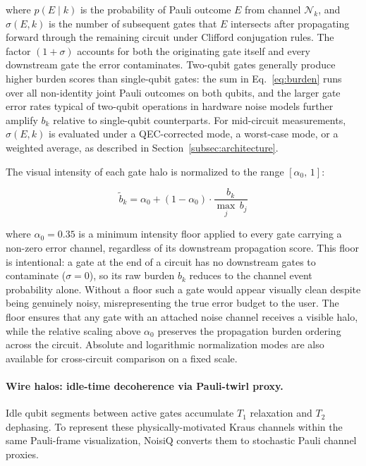 \documentclass[10pt,twocolumn]{article}
\begin{document}
\noindent
where $p(E \mid k)$ is the probability of Pauli outcome $E$ from
channel $\mathcal{N}_k$, and $\sigma(E, k)$ is the number of
subsequent gates that $E$ intersects after propagating forward
through the remaining circuit under Clifford conjugation rules.
The factor $(1 + \sigma)$ accounts for both the originating gate
itself and every downstream gate the error contaminates.
Two-qubit gates generally produce higher burden scores than
single-qubit gates: the sum in Eq.~\ref{eq:burden} runs over all
non-identity joint Pauli outcomes on both qubits, and the larger
gate error rates typical of two-qubit operations in hardware
noise models further amplify $b_k$ relative to single-qubit
counterparts.
For mid-circuit measurements, $\sigma(E, k)$ is evaluated under
a QEC-corrected mode, a worst-case mode, or a weighted average,
as described in Section~\ref{subsec:architecture}.

The visual intensity of each gate halo is normalized to the range
$[\alpha_0,\, 1]$:

\begin{equation}
    \tilde{b}_k
    = \alpha_0
    + (1 - \alpha_0)
    \cdot \frac{b_k}{\displaystyle\max_j\, b_j}
    \label{eq:halo_norm}
\end{equation}

\noindent
where $\alpha_0 = 0.35$ is a minimum intensity floor applied to
every gate carrying a non-zero error channel, regardless of its
downstream propagation score.
This floor is intentional: a gate at the end of a circuit has no
downstream gates to contaminate ($\sigma = 0$), so its raw burden
$b_k$ reduces to the channel event probability alone.
Without a floor such a gate would appear visually clean despite
being genuinely noisy, misrepresenting the true error budget to
the user.
The floor ensures that any gate with an attached noise channel
receives a visible halo, while the relative scaling above $\alpha_0$
preserves the propagation burden ordering across the circuit.
Absolute and logarithmic normalization modes are also available
for cross-circuit comparison on a fixed scale.

\paragraph{Wire halos: idle-time decoherence via Pauli-twirl proxy.}
Idle qubit segments between active gates accumulate $T_1$ relaxation
and $T_2$ dephasing.
To represent these physically-motivated Kraus channels within the
same Pauli-frame visualization, NoisiQ converts them to stochastic
Pauli channel proxies.
\end{document}
